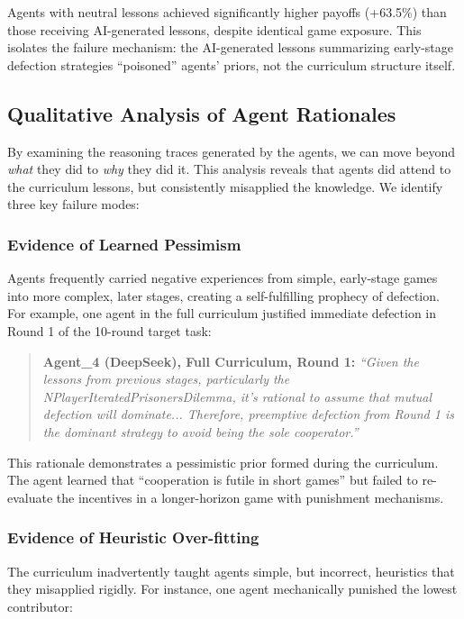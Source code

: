 \documentclass[11pt]{article}
\begin{document}
Agents with neutral lessons achieved significantly higher payoffs (+63.5\%) than those receiving AI-generated lessons, despite identical game exposure. This isolates the failure mechanism: the AI-generated lessons summarizing early-stage defection strategies ``poisoned'' agents' priors, not the curriculum structure itself.

\subsection{Qualitative Analysis of Agent Rationales}
\label{sec:qualitative}
By examining the reasoning traces generated by the agents, we can move beyond \textit{what} they did to \textit{why} they did it. This analysis reveals that agents did attend to the curriculum lessons, but consistently misapplied the knowledge. We identify three key failure modes:

\subsubsection{Evidence of Learned Pessimism}
Agents frequently carried negative experiences from simple, early-stage games into more complex, later stages, creating a self-fulfilling prophecy of defection. For example, one agent in the full curriculum justified immediate defection in Round 1 of the 10-round target task:

\begin{quote}
    \small
    \textbf{Agent\_4 (DeepSeek), Full Curriculum, Round 1:} 
    \textit{``Given the lessons from previous stages, particularly the NPlayerIteratedPrisonersDilemma, it's rational to assume that mutual defection will dominate... Therefore, preemptive defection from Round 1 is the dominant strategy to avoid being the sole cooperator.''}
\end{quote}

This rationale demonstrates a pessimistic prior formed during the curriculum. The agent learned that ``cooperation is futile in short games'' but failed to re-evaluate the incentives in a longer-horizon game with punishment mechanisms.

\subsubsection{Evidence of Heuristic Over-fitting}
The curriculum inadvertently taught agents simple, but incorrect, heuristics that they misapplied rigidly. For instance, one agent mechanically punished the lowest contributor:
\end{document}

